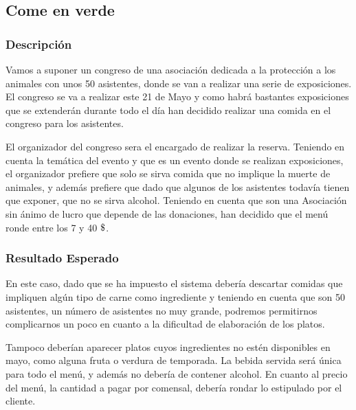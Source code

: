 \documentclass{article}
\newcommand{\dollar}{\mbox{\textdollar}}
\begin{document}
\subsection{Come en verde}
\subsubsection{Descripción}
Vamos a suponer un congreso de una asociación dedicada a la protección a los animales con unos 50 asistentes, donde se van a realizar una serie de exposiciones. El congreso se va a realizar este 21 de Mayo y como habrá bastantes exposiciones que se extenderán durante todo el día han decidido realizar una comida en el congreso para los asistentes.
\par
El organizador del congreso sera el encargado de realizar la reserva. Teniendo en cuenta la temática del evento y que es un evento donde se realizan exposiciones, el organizador prefiere que solo se sirva comida que no implique la muerte de animales, y además prefiere que dado que algunos de los asistentes todavía tienen que exponer, que no se sirva alcohol. Teniendo en cuenta que son una Asociación sin ánimo de lucro que depende de las donaciones, han decidido que el menú ronde entre los 7 y 40 $\dollar$.

\subsubsection{Resultado Esperado}
En este caso, dado que se ha impuesto el sistema debería descartar comidas que impliquen algún tipo de carne como ingrediente y teniendo en cuenta que son 50 asistentes, un número de asistentes no muy grande, podremos permitirnos complicarnos un poco en cuanto a la dificultad de elaboración de los platos.
\par
Tampoco deberían aparecer platos cuyos ingredientes no estén disponibles en mayo, como alguna fruta o verdura de temporada. La bebida servida será única para todo el menú, y además no debería de contener alcohol. En cuanto al precio del menú, la cantidad a pagar por comensal, debería rondar lo estipulado por el cliente.
\end{document}
